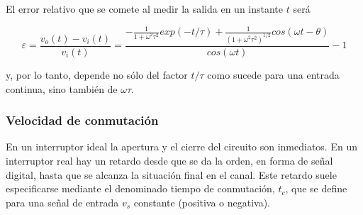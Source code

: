 El error relativo que se comete al medir la salida en un instante $t$ será

\begin{equation}
    \varepsilon = \frac{v_o(t) - v_i(t)}{v_i(t)} = \frac{-\frac{1}{1+\omega^2 \tau^2} exp(-t/\tau) + \frac{1}{(1 + \omega^2 \tau^2)^{1/2}} cos(\omega t - \theta)}{cos(\omega t)} - 1
\end{equation}

y, por lo tanto, depende no sólo del factor $t/\tau$ como sucede para una entrada continua, sino también de $\omega\tau$.

\subsubsection{Velocidad de conmutación}

En un interruptor ideal la apertura y el cierre del circuito son inmediatos. En un interruptor real hay un retardo desde que se da la orden, en forma de señal digital, hasta que se alcanza la situación final en el canal. Este retardo suele especificarse mediante el denominado tiempo de conmutación, $t_c$, que se define para una señal de entrada $v_s$ constante (positiva o negativa).







